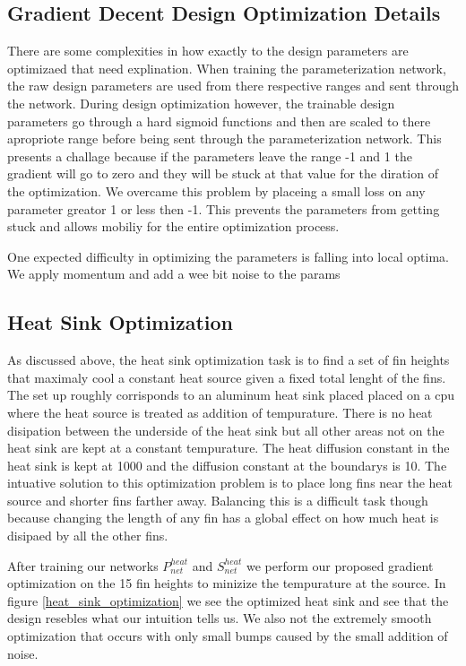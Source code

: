 \documentclass{article} %
\begin{document}
\subsection{Gradient Decent Design Optimization Details}

There are some complexities in how exactly to the design parameters are optimizaed that need explination. When training the parameterization network, the raw design parameters are used from there respective ranges and sent through the network. During design optimization however, the trainable design parameters go through a hard sigmoid functions and then are scaled to there apropriote range before being sent through the parameterization network. This presents a challage because if the parameters leave the range -1 and 1 the gradient will go to zero and they will be stuck at that value for the diration of the optimization. We overcame this problem by placeing a small loss on any parameter greator 1 or less then -1. This prevents the parameters from getting stuck and allows mobiliy for the entire optimization process.

One expected difficulty in optimizing the parameters is falling into local optima. We apply momentum and add a wee bit noise to the params

\subsection{Heat Sink Optimization}

As discussed above, the heat sink optimization task is to find a set of fin heights that maximaly cool a constant heat source given a fixed total lenght of the fins. The set up roughly corrisponds to an aluminum heat sink placed placed on a cpu where the heat source is treated as addition of tempurature. There is no heat disipation between the underside of the heat sink but all other areas not on the heat sink are kept at a constant tempurature. The heat diffusion constant in the heat sink is kept at 1000 and the diffusion constant at the boundarys is 10. The intuative solution to this optimization problem is to place long fins near the heat source and shorter fins farther away. Balancing this is a difficult task though because changing the length of any fin has a global effect on how much heat is disipaed by all the other fins. 

After training our networks $P^{heat}_{net}$ and $S^{heat}_{net}$ we perform our proposed gradient optimization on the 15 fin heights to minizize the tempurature at the source. In figure \ref{heat_sink_optimization} we see the optimized heat sink and see that the design resebles what our intuition tells us. We also not the extremely smooth optimization that occurs with only small bumps caused by the small addition of noise.
\end{document}
